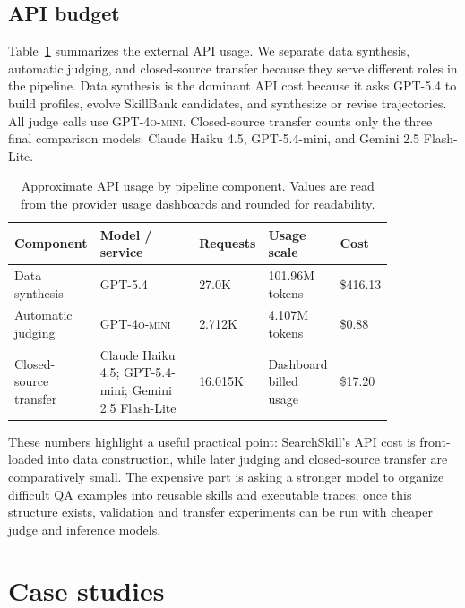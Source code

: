 \documentclass{article}
\begin{document}
\subsection{API budget}
\label{app:api-budget}

Table~\ref{tab:appendix-api-budget} summarizes the external API usage. We separate data synthesis, automatic judging, and closed-source transfer because they serve different roles in the pipeline. Data synthesis is the dominant API cost because it asks \textsc{GPT-5.4} to build profiles, evolve SkillBank candidates, and synthesize or revise trajectories. All judge calls use \textsc{GPT-4o-mini}. Closed-source transfer counts only the three final comparison models: Claude Haiku 4.5, GPT-5.4-mini, and Gemini 2.5 Flash-Lite.

\begin{table}[tbp]
  \centering
  \caption{Approximate API usage by pipeline component. Values are read from the provider usage dashboards and rounded for readability.}
  \label{tab:appendix-api-budget}
  \setlength{\tabcolsep}{2pt}
  \renewcommand{\arraystretch}{1.12}
  \scriptsize
  \begin{tabular}{@{}p{0.20\linewidth}p{0.28\linewidth}p{0.12\linewidth}p{0.15\linewidth}p{0.09\linewidth}@{}}
    \toprule
    \textbf{Component} & \textbf{Model / service} & \textbf{Requests} & \textbf{Usage scale} & \textbf{Cost} \\
    \midrule
    Data synthesis & \textsc{GPT-5.4} & 27.0K & 101.96M tokens & \$416.13 \\
    Automatic judging & \textsc{GPT-4o-mini} & 2.712K & 4.107M tokens & \$0.88 \\
    Closed-source transfer & Claude Haiku 4.5; GPT-5.4-mini; Gemini 2.5 Flash-Lite & 16.015K & Dashboard billed usage & \$17.20 \\
    \bottomrule
  \end{tabular}
\end{table}

These numbers highlight a useful practical point: SearchSkill's API cost is front-loaded into data construction, while later judging and closed-source transfer are comparatively small. The expensive part is asking a stronger model to organize difficult QA examples into reusable skills and executable traces; once this structure exists, validation and transfer experiments can be run with cheaper judge and inference models.

\section{Case studies}
\label{app:case-studies}
\end{document}
